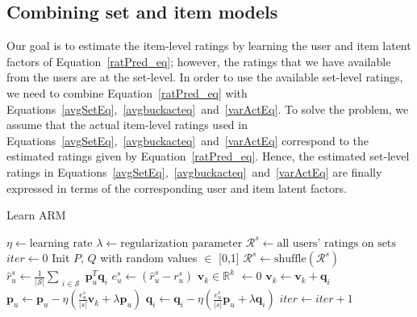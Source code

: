 \subsection{Combining set and item models}


Our goal is to estimate the item-level ratings by learning the user and item
latent factors of Equation~\ref{ratPred_eq}; however, the ratings that we have available
from the users are at the set-level. In order to use the available set-level
ratings, we need to combine 
Equation~\ref{ratPred_eq} with
Equations~\ref{avgSetEq},~\ref{avgbuckacteq}~and~\ref{varActEq}. To solve the problem, we assume that the actual
item-level ratings used in Equations~\ref{avgSetEq},~\ref{avgbuckacteq}~and~\ref{varActEq} correspond to the estimated ratings
given by Equation~\ref{ratPred_eq}. Hence, the estimated set-level ratings in
Equations~\ref{avgSetEq},~\ref{avgbuckacteq}~and~\ref{varActEq}
are finally expressed in terms of the corresponding user and item latent
factors.

\begin{algorithm}
  \caption{Learn ARM}
  \label{alg:alg-lfs-arm}
  \begin{algorithmic}[1]
    \State $\eta \gets  \text{learning rate}$
    \State $\lambda \gets \text{regularization parameter}$
    \State $\mathcal{R}^s \gets \text{all users' ratings on sets}$  
    \State $iter \gets 0$
    \State Init $P$, $Q$ with random values $\in$ [0,1] 
      \State $\mathcal{R}^s \gets \text{shuffle}(\mathcal{R}^s)$
        \State $\hat{r}_{u}^s \gets  \frac{1}{|\mathcal{S}|} \sum_{\substack{i
        \in \mathcal{S}}} \bm{p}_u^T\bm{q}_i$ 
        \State $e_{u}^s \gets (\hat{r}_{u}^s - r_{u}^s)$
        \State $\bm{v}_k \in \mathbb{R}^k$  $\gets 0$
        \State $\bm{v}_k \gets \bm{v}_k + \bm{q}_i$
        \EndFor
        \State $\bm{p}_u \gets \bm{p}_u - \eta(\frac{e_{u}^s}{|s|} \bm{v}_k +
        \lambda \bm{p}_u)$ 
          \State $\bm{q}_i \gets \bm{q}_i - \eta(\frac{e_{u}^s}{|s|} \bm{p}_u +
            \lambda \bm{q}_i)$  
        \EndFor
      \EndFor
      \State $iter \gets iter + 1$
    \EndWhile
    \EndProcedure
  \end{algorithmic}
\end{algorithm}

